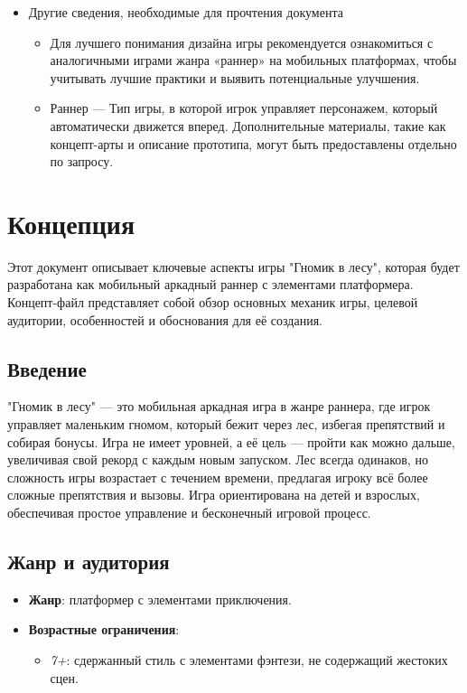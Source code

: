 \documentclass{article}
\begin{document}
\begin{itemize}
\item Другие сведения, необходимые для прочтения документа
	\begin{itemize}
            \item Для лучшего понимания дизайна игры рекомендуется ознакомиться с аналогичными играми жанра «раннер» на мобильных платформах, чтобы учитывать лучшие практики и выявить потенциальные улучшения.
            \item Раннер — Тип игры, в которой игрок управляет персонажем, который автоматически движется вперед.
            Дополнительные материалы, такие как концепт-арты и описание прототипа, могут быть предоставлены отдельно по запросу.
	\end{itemize}
\end{itemize}

\section{Концепция}

Этот документ описывает ключевые аспекты игры "Гномик в лесу", которая будет разработана как мобильный аркадный раннер с элементами платформера. Концепт-файл представляет собой обзор основных механик игры, целевой аудитории, особенностей и обоснования для её создания.

\subsection{Введение}

"Гномик в лесу" — это мобильная аркадная игра в жанре раннера, где игрок управляет маленьким гномом, который бежит через лес, избегая препятствий и собирая бонусы. Игра не имеет уровней, а её цель — пройти как можно дальше, увеличивая свой рекорд с каждым новым запуском. Лес всегда одинаков, но сложность игры возрастает с течением времени, предлагая игроку всё более сложные препятствия и вызовы. Игра ориентирована на детей и взрослых, обеспечивая простое управление и бесконечный игровой процесс.

\subsection{Жанр и аудитория}

\begin{itemize}
    \item \textbf{Жанр}: платформер с элементами приключения.
    \item \textbf{Возрастные ограничения}:
    \begin{itemize}
        \item \textit{7+}: сдержанный стиль с элементами фэнтези, не содержащий жестоких сцен.
    \end{itemize}
\end{itemize}
\end{document}
